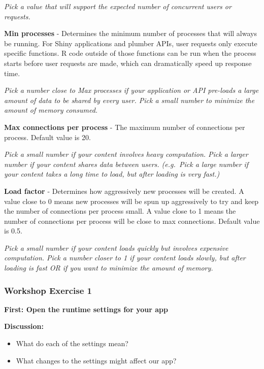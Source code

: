 \documentclass[]{book}
\providecommand{\tightlist}{%
  \setlength{\itemsep}{0pt}\setlength{\parskip}{0pt}}
\theoremstyle{definition}
\theoremstyle{definition}
\theoremstyle{definition}
\theoremstyle{remark}
\begin{document}
\emph{Pick a value that will support the expected number of concurrent
users or requests.}

\textbf{Min processes} - Determines the minimum number of processes that
will always be running. For Shiny applications and plumber APIs, user
requests only execute specific functions. R code outside of those
functions can be run when the process starts before user requests are
made, which can dramatically speed up response time.

\emph{Pick a number close to Max processes if your application or API
pre-loads a large amount of data to be shared by every user. Pick a
small number to minimize the amount of memory consumed.}

\textbf{Max connections per process} - The maximum number of connections
per process. Default value is 20.

\emph{Pick a small number if your content involves heavy computation.
Pick a larger number if your content shares data between users.
(e.g.~Pick a large number if your content takes a long time to load, but
after loading is very fast.)}

\textbf{Load factor} - Determines how aggressively new processes will be
created. A value close to 0 means new processes will be spun up
aggressively to try and keep the number of connections per process
small. A value close to 1 means the number of connections per process
will be close to max connections. Default value is 0.5.

\emph{Pick a small number if your content loads quickly but involves
expensive computation. Pick a number closer to 1 if your content loads
slowly, but after loading is fast OR if you want to minimize the amount
of memory.}

\hypertarget{workshop-exercise-1}{%
\subsubsection{Workshop Exercise 1}\label{workshop-exercise-1}}

\textbf{First: Open the runtime settings for your app}

\textbf{Discussion:}

\begin{itemize}
\tightlist
\item
  What do each of the settings mean?
\item
  What changes to the settings might affect our app?
\end{itemize}
\end{document}
